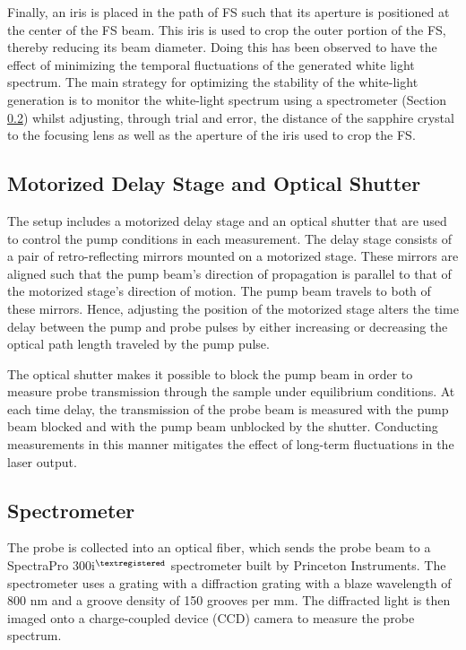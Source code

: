 Finally, an iris is placed in the path of FS such that its aperture is positioned at the center of the FS beam. This iris is used to crop the outer portion of the FS, thereby reducing its beam diameter. Doing this has been observed to have the effect of minimizing the temporal fluctuations of the generated white light spectrum. The main strategy for optimizing the stability of the white-light generation is to monitor the white-light spectrum using a spectrometer (Section \ref{section:spectrometer}) whilst adjusting, through trial and error, the distance of the sapphire crystal to the focusing lens as well as the aperture of the iris used to crop the FS.

\subsection{Motorized Delay Stage and Optical Shutter}

The setup includes a motorized delay stage and an optical shutter that are used to control the pump conditions in each measurement. The delay stage consists of a pair of retro-reflecting mirrors mounted on a motorized stage. These mirrors are aligned such that the pump beam's direction of propagation is parallel to that of the motorized stage's direction of motion. The pump beam travels to both of these mirrors. Hence, adjusting the position of the motorized stage alters the time delay between the pump and probe pulses by either increasing or decreasing the optical path length traveled by the pump pulse.

The optical shutter makes it possible to block the pump beam in order to measure probe transmission through the sample under equilibrium conditions. At each time delay, the transmission of the probe beam is measured with the pump beam blocked and with the pump beam unblocked by the shutter. Conducting measurements in this manner mitigates the effect of long-term fluctuations in the laser output.

\subsection{Spectrometer}
\label{section:spectrometer}
The probe is collected into an optical fiber, which sends the probe beam to a SpectraPro 300i$^{\tiny \textregistered}$ spectrometer built by Princeton Instruments.  The spectrometer uses a grating with a diffraction grating with a blaze wavelength of 800 nm and a groove density of 150 grooves per mm. The diffracted light is then imaged onto a charge-coupled device (CCD) camera to measure the probe spectrum.

